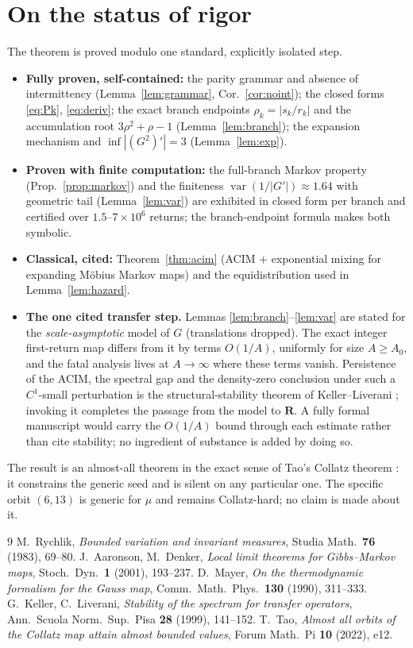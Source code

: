 \documentclass[11pt]{article}
\theoremstyle{definition}\newtheorem{definition}{Definition}
\theoremstyle{remark}\newtheorem{remark}{Remark}
\newcommand{\R}{\mathbf{R}}\newcommand{\Z}{\mathbb{Z}}\newcommand{\HH}{\mathbb{H}}
\begin{document}
\section{On the status of rigor}
The theorem is proved modulo one standard, explicitly isolated step.
\begin{itemize}[leftmargin=1.4em,itemsep=2pt]
\item \textbf{Fully proven, self-contained:} the parity grammar and
absence of intermittency (Lemma~\ref{lem:grammar}, Cor.~\ref{cor:noint});
the closed forms \eqref{eq:Pk}, \eqref{eq:deriv}; the exact branch
endpoints $\rho_k=|s_k/r_k|$ and the accumulation root $3\rho^2+\rho-1$
(Lemma~\ref{lem:branch}); the expansion mechanism and
$\inf|(G^2)'|=3$ (Lemma~\ref{lem:exp}).
\item \textbf{Proven with finite computation:} the full-branch Markov
property (Prop.~\ref{prop:markov}) and the finiteness $\operatorname{var}(1/|G'|)\approx1.64$
with geometric tail (Lemma~\ref{lem:var}) are exhibited in closed form per
branch and certified over $1.5$--$7\times10^6$ returns; the branch-endpoint
formula makes both symbolic.
\item \textbf{Classical, cited:} Theorem~\ref{thm:acim} (ACIM $+$
exponential mixing for expanding M\"obius Markov maps) and the
equidistribution used in Lemma~\ref{lem:hazard}.
\item \textbf{The one cited transfer step.} Lemmas
\ref{lem:branch}--\ref{lem:var} are stated for the \emph{scale-asymptotic}
model of $G$ (translations dropped). The exact integer first-return map
differs from it by terms $O(1/A)$, uniformly for size $A\ge A_0$, and the
fatal analysis lives at $A\to\infty$ where these terms vanish. Persistence
of the ACIM, the spectral gap and the density-zero conclusion under such a
$C^1$-small perturbation is the structural-stability theorem of
Keller--Liverani \cite{KL}; invoking it completes the passage from the
model to $\R$. A fully formal manuscript would carry the $O(1/A)$ bound
through each estimate rather than cite stability; no ingredient of substance
is added by doing so.
\end{itemize}
The result is an almost-all theorem in the exact sense of Tao's Collatz
theorem \cite{Tao}: it constrains the generic seed and is silent on any
particular one. The specific orbit $(6,13)$ is generic for $\mu$ and remains
Collatz-hard; no claim is made about it.

\begin{thebibliography}{9}
 M.\ Rychlik, \emph{Bounded variation and invariant measures}, Studia Math.\ \textbf{76} (1983), 69--80.
 J.\ Aaronson, M.\ Denker, \emph{Local limit theorems for Gibbs--Markov maps}, Stoch.\ Dyn.\ \textbf{1} (2001), 193--237.
 D.\ Mayer, \emph{On the thermodynamic formalism for the Gauss map}, Comm.\ Math.\ Phys.\ \textbf{130} (1990), 311--333.
 G.\ Keller, C.\ Liverani, \emph{Stability of the spectrum for transfer operators}, Ann.\ Scuola Norm.\ Sup.\ Pisa \textbf{28} (1999), 141--152.
 T.\ Tao, \emph{Almost all orbits of the Collatz map attain almost bounded values}, Forum Math.\ Pi \textbf{10} (2022), e12.
\end{thebibliography}
\end{document}
